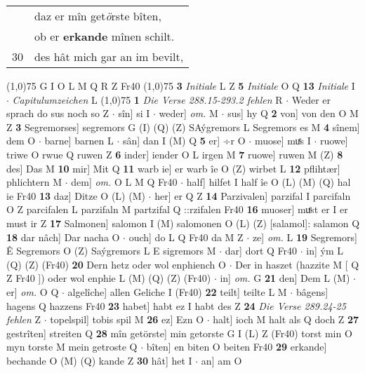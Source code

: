 \documentclass[8pt,a4paper,notitlepage]{article}
\begin{document}
\begin{table}[ht]
\begin{minipage}[t]{0.5\linewidth}
\begin{tabular}{rl}
 & daz er mîn get\textit{ö}rste bîten,\\ 
 & ob er \textbf{erkande} mînen schilt.\\ 
30 & des hât mich gar an im bevilt,\\ 
\end{tabular}
\scriptsize
\line(1,0){75} \newline
G I O L M Q R Z Fr40 \newline
\line(1,0){75} \newline
\textbf{3} \textit{Initiale} L Z  \textbf{5} \textit{Initiale} O Q  \textbf{13} \textit{Initiale} I   $\cdot$ \textit{Capitulumzeichen} L  \newline
\line(1,0){75} \newline
\textbf{1} \textit{Die Verse 288.15-293.2 fehlen} R   $\cdot$ Weder er sprach do sus noch so Z  $\cdot$ sîn] si I  $\cdot$ weder] \textit{om.} M  $\cdot$ sus] hy Q \textbf{2} von] von den O M Z \textbf{3} Segremorses] segremors G (I) (Q) (Z) SAýgremors L Segremors es M \textbf{4} sînem] dem O  $\cdot$ barne] barnen L  $\cdot$ sân] dan I (M) Q \textbf{5} er] ÷r O  $\cdot$ muose] muͤs I  $\cdot$ ruowe] triwe O rwue Q ruwen Z \textbf{6} inder] iender O L irgen M \textbf{7} ruowe] ruwen M (Z) \textbf{8} des] Das M \textbf{10} mir] Mit Q \textbf{11} warb ie] er warb îe O (Z) wirbet L \textbf{12} pflihtær] phlichtern M  $\cdot$ dem] \textit{om.} O L M Q Fr40  $\cdot$ half] hilfet I half îe O (L) (M) (Q) hal ie Fr40 \textbf{13} daz] Ditze O (L) (M)  $\cdot$ her] er Q Z \textbf{14} Parzivalen] parzifal I parcifaln O Z parcifalen L parzifaln M partzifal Q ::rzifalen Fr40 \textbf{16} muoser] muͤst er I er must ir Z \textbf{17} Salmonen] salomon I (M) salomonen O (L) (Z) [salamol]: salamon  Q \textbf{18} dar nâch] Dar nacha O  $\cdot$ ouch] do L Q Fr40 da M Z  $\cdot$ ze] \textit{om.} L \textbf{19} Segremors] Ê Segremors O (Z) Saýgremors L E sigremors M  $\cdot$ dar] dort Q Fr40  $\cdot$ in] ým L (Q) (Z) (Fr40) \textbf{20} Dern hetz oder wol enphiench O  $\cdot$ Der in haszet (hazzite M [ Q Z Fr40 ]) oder wol enphie L (M) (Q) (Z) (Fr40)  $\cdot$ in] \textit{om.} G \textbf{21} den] Dem L (M)  $\cdot$ er] \textit{om.} O Q  $\cdot$ algelîche] allen Geliche I (Fr40) \textbf{22} teilt] teilte L M  $\cdot$ bâgens] hagens Q hazzens Fr40 \textbf{23} habet] habt ez I habt des Z \textbf{24} \textit{Die Verse 289.24-25 fehlen} Z   $\cdot$ topelspil] tobis spil M \textbf{26} ez] Ezn O  $\cdot$ halt] ioch M halt als Q doch Z \textbf{27} gestrîten] streiten Q \textbf{28} mîn getörste] min getorste G I (L) Z (Fr40) torst min O myn torste M mein getroste Q  $\cdot$ bîten] en biten O beiten Fr40 \textbf{29} erkande] bechande O (M) (Q) kande Z \textbf{30} hât] het I  $\cdot$ an] am O \newline

\end{minipage}
\end{table}
\end{document}
